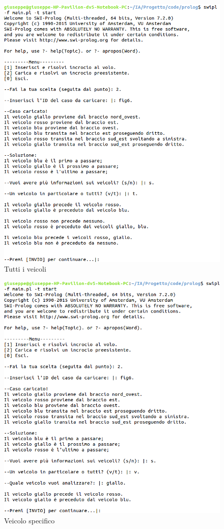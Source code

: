 \begin{figure}[!htb]
	\centering
	\includegraphics[width=.9\textwidth]{images/shell/info2}
	\caption{Tutti i veicoli}
\end{figure}

\begin{figure}[!htb]
	\centering
	\includegraphics[width=.9\textwidth]{images/shell/info3}
	\caption{Veicolo specifico}
\end{figure}

